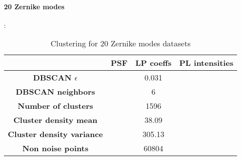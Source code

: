 		\paragraph{20 Zernike modes}:
		\begin{table}[h!]
			\centering
			\begin{tabular}{|c|c|c|c|}
				\hline
				\textbf{} & \textbf{PSF} & \textbf{LP coeffs} & \textbf{PL intensities}\\
				\hline
				\textbf{DBSCAN $\epsilon$} &  & 0.031 & \\
				\hline
				\textbf{DBSCAN neighbors} &  & 6 & \\
				\hline
				\textbf{Number of clusters} &  & 1596 & \\
				\hline
				\textbf{Cluster density mean} &  & 38.09 & \\
				\hline
				\textbf{Cluster density variance} &  & 305.13 & \\
				\hline
				\textbf{Non noise points} &  & 60804 & \\
				\hline
			\end{tabular}
		\caption{Clustering for 20 Zernike modes datasets}
		\end{table}